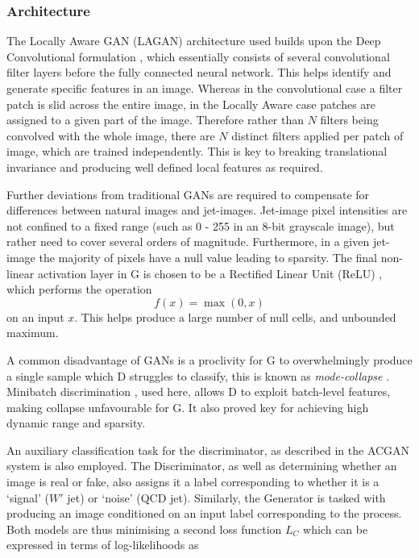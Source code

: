 \documentclass[twocolumn]{article}
\begin{document}
\subsubsection{Architecture}
The Locally Aware GAN (LAGAN) architecture used builds upon the Deep Convolutional formulation \cite{Radford2015}, which essentially consists of several convolutional filter layers before the fully connected neural network. This helps identify and generate specific features in an image. Whereas in the convolutional case a filter patch is slid across the entire image, in the Locally Aware case patches are assigned to a given part of the image. Therefore rather than $N$ filters being convolved with the whole image, there are $N$ distinct filters applied per patch of image, which are trained independently. This is key to breaking translational invariance and producing well defined local features as required.

Further deviations from traditional GANs are required to compensate for differences between natural images and jet-images. Jet-image pixel intensities are not confined to a fixed range (such as 0 - 255 in an 8-bit grayscale image), but rather need to cover several orders of magnitude. Furthermore, in a given jet-image the majority of pixels have a null value leading to sparsity. The final non-linear activation layer in G is chosen to be a Rectified Linear Unit (ReLU) \cite{relu}, which performs the operation
$$
f(x) = \max(0, x)
$$
on an input $x$. This helps produce a large number of null cells, and unbounded maximum. 

A common disadvantage of GANs is a proclivity for G to overwhelmingly produce a single sample which D struggles to classify, this is known as \textit{mode-collapse} \cite{gan1}. Minibatch discrimination \cite{improvedgan}, used here, allows D to exploit batch-level features, making collapse unfavourable for G. It also proved key for achieving high dynamic range and sparsity.

An auxiliary classification task for the discriminator, as described in the ACGAN system \cite{odena2016conditional} is also employed. The Discriminator, as well as determining whether an image is real or fake, also assigns it a label corresponding to whether it is a `signal' ($W'$ jet) or `noise' (QCD jet). Similarly, the Generator is tasked with producing an image conditioned on an input label corresponding to the process. Both models are thus minimising a second loss function $L_C$ which can be expressed in terms of log-likelihoods as
\end{document}
